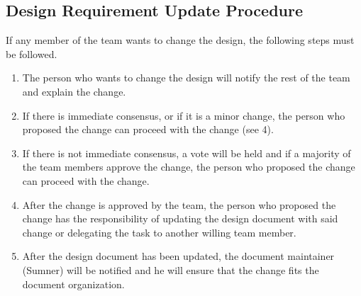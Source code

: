 \documentclass[12pt,titlepage]{article}
\begin{document}
\subsection{Design Requirement Update Procedure}
If any member of the team wants to change the design, the following steps must
be followed.

\begin{enumerate}
    \item The person who wants to change the design will notify the rest of the
        team and explain the change.

    \item If there is immediate consensus, or if it is a minor change, the
        person who proposed the change can proceed with the change (see 4).

    \item If there is not immediate consensus, a vote will be held and if a
        majority of the team members approve the change, the person who proposed
        the change can proceed with the change.

    \item After the change is approved by the team, the person who proposed the
        change has the responsibility of updating the design document with said
        change or delegating the task to another willing team member.

    \item After the design document has been updated, the document maintainer
        (Sumner) will be notified and he will ensure that the change fits the
        document organization.
\end{enumerate}
\end{document}
